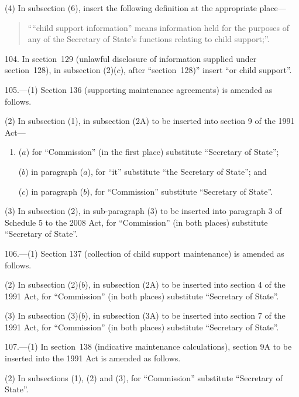 \documentclass[12pt,a4paper]{article}
\begin{document}
(4) In subsection (6), insert the following definition at the appropriate place—
\begin{quotation}
““child support information” means information held for the purposes of any of the Secretary of State’s functions relating to child support;”.
\end{quotation}

\medskip

104.  In section~129 (unlawful disclosure of information supplied under section~128), in subsection (2)($c$), after “section~128)” insert “or child support”.

\enlargethispage{-2\baselineskip}

\medskip

105.---(1)  Section 136 (supporting maintenance agreements) is amended as follows.

(2) In subsection (1), in subsection (2A) to be inserted into section 9 of the 1991 Act—
\begin{enumerate}\item[]
($a$) for “Commission” (in the first place) substitute “Secretary of State”;

($b$) in paragraph ($a$), for “it” substitute “the Secretary of State”; and

($c$) in paragraph ($b$), for “Commission” substitute “Secretary of State”.
\end{enumerate}

(3) In subsection (2), in sub-paragraph (3) to be inserted into paragraph 3 of Schedule 5 to the 2008 Act, for “Commission” (in both places) substitute “Secretary of State”.

\medskip

106.---(1)  Section 137 (collection of child support maintenance) is amended as follows.

(2) In subsection (2)($b$), in subsection (2A) to be inserted into section 4 of the 1991 Act, for “Commission” (in both places) substitute “Secretary of State”.

(3) In subsection (3)($b$), in subsection (3A) to be inserted into section 7 of the 1991 Act, for “Commission” (in both places) substitute “Secretary of State”.

\medskip

107.---(1)  In section~138 (indicative maintenance calculations), section 9A to be inserted into the 1991 Act is amended as follows.

(2) In subsections (1), (2) and (3), for “Commission” substitute “Secretary of State”.
\end{document}
